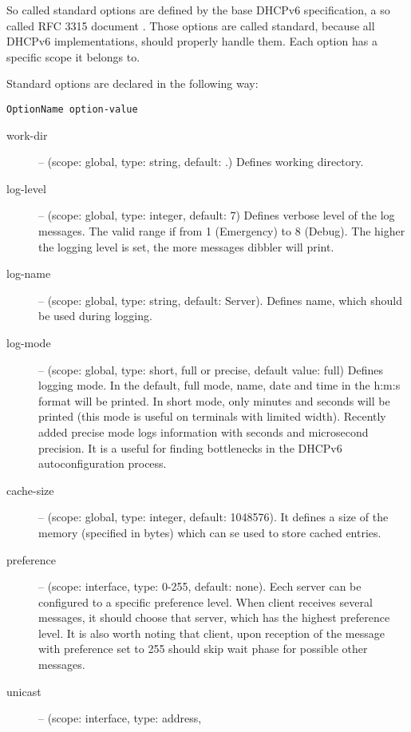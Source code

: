 So called standard options are defined by the base DHCPv6 specification,
a so called RFC 3315 document \cite{rfc3315}. Those options are
called standard, because all DHCPv6 implementations, should properly
handle them. Each option has a specific scope it belongs to. 

Standard options are declared in the following way:

\begin{verbatim}
OptionName option-value
\end{verbatim}

\begin{description}
 \item[work-dir] -- (scope: global, type: string, default: .) Defines working
	    directory.
 \item[log-level] -- (scope: global, type: integer, default: 7) Defines
	    verbose level of the log messages. The valid range if
	    from 1 (Emergency) to 8 (Debug). The higher the logging
	    level is set, the more messages dibbler will print.
 \item[log-name] -- (scope: global, type: string, default: Server). Defines 
	    name, which should be used during logging.
 \item[log-mode] -- (scope: global, type: short, full or precise,
	    default value: full) Defines logging mode. In the
	    default, full mode, name, date and time in the h:m:s format
	    will be printed. In short mode, only minutes and
	    seconds will be printed (this mode is useful on
	    terminals with limited width). Recently added precise
	    mode logs information with seconds and microsecond
	    precision. It is a useful for finding bottlenecks in
	    the DHCPv6 autoconfiguration process.
 \item[cache-size] -- (scope: global, type: integer, default:
	    1048576). It defines a size of the memory (specified in
            bytes) which can se used to store cached entries.
 \item[preference] -- (scope: interface, type: 0-255, default:
	    none). Eech server can be configured to a specific
	    preference level. When client receives several
	     messages, it should choose that server,
	    which has the highest preference level. It is also worth
	    noting that client, upon reception of the 
	    message with preference set to 255 should skip wait phase
	    for possible other  messages.
 \item[unicast] -- (scope: interface, type: address,

\end{description}

